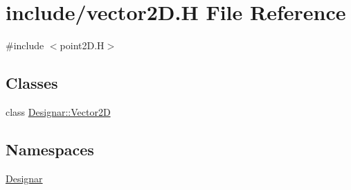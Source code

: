 \hypertarget{vector2_d_8_h}{}\section{include/vector2D.H File Reference}
\label{vector2_d_8_h}
{\ttfamily \#include $<$point2\+D.\+H$>$}\newline
\subsection*{Classes}
\begin{DoxyCompactItemize}
\item 
class \hyperlink{class_designar_1_1_vector2_d}{Designar\+::\+Vector2D}
\end{DoxyCompactItemize}
\subsection*{Namespaces}
\begin{DoxyCompactItemize}
\item 
 \hyperlink{namespace_designar}{Designar}
\end{DoxyCompactItemize}

